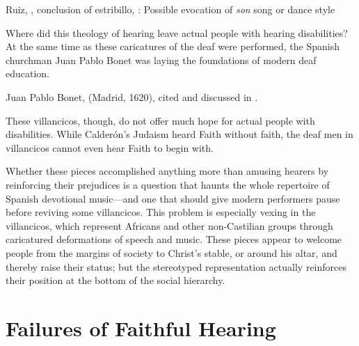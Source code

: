 \begin{musicexample}
    \caption{Ruiz, , conclusion of estribillo,
    : Possible evocation of \emph{son} song or dance style}

    \label{music:Ruiz-Sordos-son}

\end{musicexample}

Where did this theology of hearing leave actual people with hearing
disabilities? 
At the same time as these caricatures of the deaf were performed, the Spanish
churchman Juan Pablo Bonet was laying the foundations of modern deaf education.%
\begin{Footnote}
    Juan Pablo Bonet,  (Madrid, 1620), cited and discussed in
    \autocite{Plann:DeafEducationSpain}.  
\end{Footnote}
These villancicos, though, do not offer much hope for actual people with
disabilities.
While Calderón's Judaism heard Faith without faith, the deaf men in villancicos
cannot even hear Faith to begin with.

Whether these pieces accomplished anything more than amusing hearers by
reinforcing their prejudices is a question that haunts the whole repertoire of
Spanish devotional music---and one that should give modern performers pause
before reviving some villancicos.%
    \Autocite[7]{Cashner:WLSCM32}
This problem is especially vexing in the  villancicos, which
represent Africans and other non-Castilian groups through caricatured
deformations of speech and music.%
    \Autocites{Baker:EthnicVC}{Baker:PerformancePostColonial}
These pieces appear to welcome people from the margins of society to Christ's
stable, or around his altar, and thereby raise their status; but the stereotyped
representation actually reinforces their position at the bottom of the social
hierarchy.

\section{Failures of Faithful Hearing}

